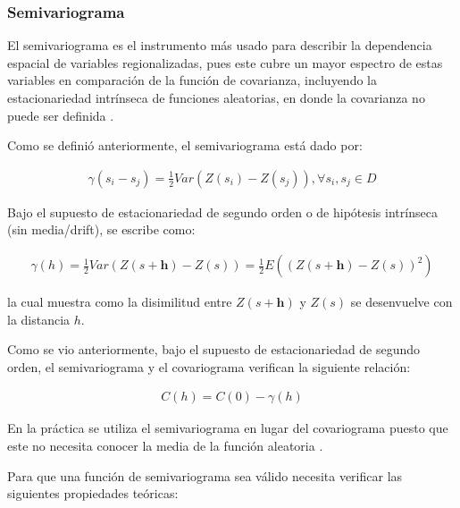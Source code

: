 \documentclass[
]{book}
\begin{document}
\hypertarget{semivariograma}{%
\subsubsection*{Semivariograma}\label{semivariograma}}

El semivariograma es el instrumento más usado para describir la dependencia espacial de variables regionalizadas, pues este cubre un mayor espectro de estas variables en comparación de la función de covarianza, incluyendo la estacionariedad intrínseca de funciones aleatorias, en donde la covarianza no puede ser definida \citep{montero}.

Como se definió anteriormente, el semivariograma está dado por:

\begin{align*}
  \gamma(s_i-s_j)=\frac{1}{2}Var(Z(s_i)-Z(s_j)),\forall s_i,s_j \in D  
\end{align*}

Bajo el supuesto de estacionariedad de segundo orden o de hipótesis intrínseca (sin media/drift), se escribe como:

\begin{align*}
  \gamma(h)=\frac{1}{2}Var(Z(s+\textbf{h})-Z(s))=\frac{1}{2}E((Z(s+\textbf{h})-Z(s))^2)  
\end{align*}

la cual muestra como la disimilitud entre \(Z(s+\textbf{h})\) y \(Z(s)\) se desenvuelve con la distancia \(h\).

Como se vio anteriormente, bajo el supuesto de estacionariedad de segundo orden, el semivariograma y el covariograma verifican la siguiente relación:

\begin{align*}
  C(h)=C(0)-\gamma(h)  
\end{align*}

En la práctica se utiliza el semivariograma en lugar del covariograma puesto que este no necesita conocer la media de la función aleatoria \citep{montero}.

Para que una función de semivariograma sea válido necesita verificar las siguientes propiedades teóricas:
\end{document}
